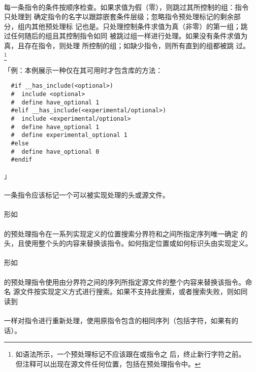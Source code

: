 \paragraph{}
每一条指令的条件按顺序检查。如果求值为假（零），则跳过其所控制的组：指令只处理到
确定指令的名字以跟踪嵌套条件层级；忽略指令预处理标记的剩余部分，组内其他预处理标
记也是。只处理控制条件求值为真（非零）的第一组；跳过任何随后的组且其控制指令如同
被跳过组一样进行处理。如果没有条件求值为真，且存在指令，则处理
所控制的组；如缺少指令，则所有直到的组都被跳
过。\footnote{如语法所示，一个预处理标记不应该跟在或指令之
后，终止新行字符之前。但注释可以出现在源文件任何位置，包括在预处理指令中。}

「例：本例展示一种仅在其可用时才包含库的方法：
\begin{lstlisting}
  #if __has_include(<optional>)
  #  include <optional>
  #  define have_optional 1
  #elif __has_include(<experimental/optional>)
  #  include <experimental/optional>
  #  define have_optional 1
  #  define experimental_optional 1
  #else
  #  define have_optional 0
  #endif
\end{lstlisting}」

\paragraph{}
一条指令应该标记一个可以被实现处理的头或源文件。

\paragraph{}
形如                                                                          \\
\mbox{}    \\
的预处理指令在一系列实现定义的位置搜索分界符\tm{<}和\tm{>}之间所指定序列唯一确定
的头，且使用整个头的内容来替换该指令。如何指定位置或如何标识头由实现定义。

\paragraph{}
形如                                                                          \\
\mbox{}    \\
的预处理指令使用由分界符之间的序列所指定源文件的整个内容来替换该指令。命名
源文件按实现定义方式进行搜索。如果不支持此搜索，或者搜索失败，则如同读到      \\
\mbox{}    \\
一样对指令进行重新处理，使用原指令包含的相同序列（包括\tm{>}字符，如果有的话）。

